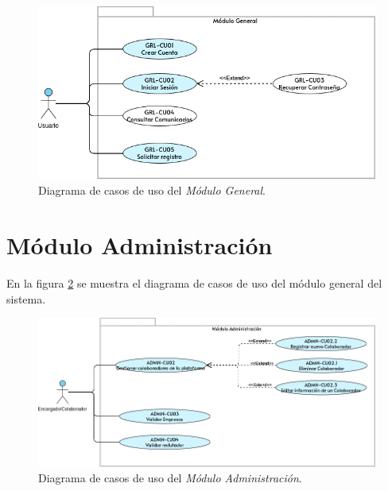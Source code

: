 	\begin{figure}[hbtp!]
		\begin{center}
			\includegraphics[width=1 \textwidth]{anexos/imagenes/CUGRL.png}
		\end{center}
		
		\caption{Diagrama de casos de uso del \textit{Módulo General}.}
		\label{adcu:grl}
	\end{figure}

	
	

	
	
	
	
	

	\clearpage
\section{Módulo Administración}
	En la figura \ref{adcu:admn} se muestra el diagrama de casos de uso del módulo general del sistema.

	\begin{figure}[hbtp!]
		\begin{center}
			\includegraphics[width=1 \textwidth]{anexos/imagenes/CUADMN.png}
		\end{center}
		
		\caption{Diagrama de casos de uso del \textit{Módulo Administración}.}
		\label{adcu:admn}
	\end{figure}

